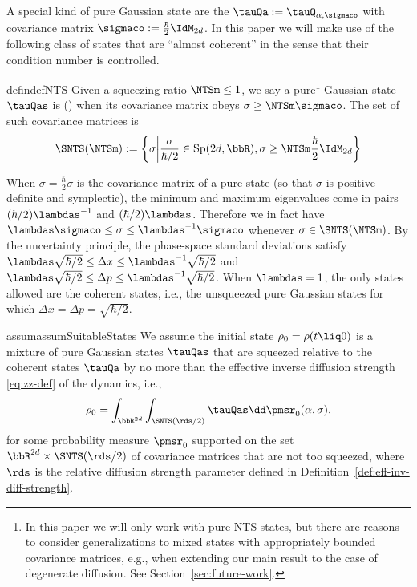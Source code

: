 \documentclass{article}
\numberwithin{equation}{section}
\begin{document}
A special kind of pure Gaussian state are the  $\tauQa:= \tauQ_{\alpha,\sigmaco}$ with covariance matrix $\sigmaco :=\frac{\hbar}{2}\IdM_{2d}$.  In this paper we will make use of the following class of states that are ``almost coherent'' in the sense that their condition number is controlled.

\begin{restatable}{defin}{defNTS}\label{def:NTS}
Given a squeezing ratio
$\NTSm \leq 1$,  
we say a pure\footnote{In this paper we will only work with pure NTS states, but there are reasons to consider generalizations to mixed states with appropriately bounded covariance matrices, e.g., when extending our main result to the case of degenerate diffusion. See Section~\ref{sec:future-work}.}
Gaussian state $\tauQas$ is  () when its covariance matrix obeys $\sigma \geq \NTSm \sigmaco$. The set of such covariance matrices is 
\begin{align}
    \SNTS(\NTSm) := 
    \left\{\sigma \middle| \frac{\sigma}{\hbar/2} \in \mathrm{Sp}(2d,\bbR), \sigma \geq \NTSm\frac{\hbar}{2}\IdM_{2d}\right\}
\end{align}
\end{restatable}
When $\sigma = \frac{\hbar}{2}\bar{\sigma}$ is the covariance matrix of a pure state (so that $\bar{\sigma}$ is positive-definite and symplectic),
the minimum and maximum eigenvalues come in pairs $(\hbar/2)\lambdas^{-1}$ and $(\hbar/2)\lambdas$. 
Therefore we in fact have $\lambdas\sigmaco \le \sigma \le \lambdas^{-1}\sigmaco$ whenever $\sigma\in \SNTS(\NTSm)$. 
By the uncertainty principle, the phase-space standard deviations satisfy $\lambdas\sqrt{\hbar/2} \le \Delta x \le \lambdas^{-1}\sqrt{\hbar/2}$ and $\lambdas\sqrt{\hbar/2} \le \Delta p \le \lambdas^{-1}\sqrt{\hbar/2}$.
When $\lambdas=1$, the only states allowed are the coherent states, i.e., the unsqueezed pure Gaussian states for which $\Delta x = \Delta p = \sqrt{\hbar/2}$.

\begin{restatable}{assum}{assumSuitableStates}
\label{assum:suitableStates}
We assume the initial state $\rho_0=\rho(t \liq 0)$ is a mixture of pure Gaussian states $\tauQas$ that are squeezed relative to the coherent states $\tauQa$ by no more than the effective inverse diffusion strength \eqref{eq:zz-def} of the dynamics, i.e.,
\begin{align}
    \rho_0 = \int_{\bbR^{2d}} \int_{\SNTS(\rds/2)} \tauQas \dd\pmsr_0(\alpha,\sigma).
\end{align}
for some probability measure $\pmsr_0$ supported on the set $\bbR^{2d}\times \SNTS(\rds/2)$ of covariance matrices that are not too squeezed,
where $\rds$ is the relative diffusion strength parameter
defined in Definition~\ref{def:eff-inv-diff-strength}.
\end{restatable}
\end{document}
